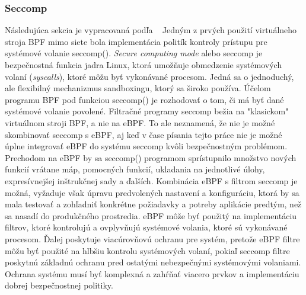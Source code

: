 \subsubsection{Seccomp}
Následujúca sekcia je vypracovaná podľa ~\cite{seccomp}
Jedným z prvých použití virtuálneho stroja BPF mimo siete bola implementácia politík kontroly prístupu pre systémové volanie seccomp(). 
\emph{Secure computing mode} alebo seccomp je bezpečnostná funkcia jadra Linux, ktorá umožňuje obmedzenie systémových volaní (\emph{syscalls}), 
ktoré môžu byť vykonávané procesom. Jedná sa o jednoduchý, ale flexibilný mechanizmus sandboxingu, ktorý sa široko používa. 
Účelom programu BPF pod funkciou seccomp() je rozhodovať o tom, či má byť dané systémové volanie povolené. Filtračné programy 
seccomp bežia na "klasickom" virtuálnom stroji BPF, a nie na eBPF. To ale neznamená, že nie je možné skombinovať seccomp s eBPF, 
aj keď v čase písania tejto práce nie je možné úplne integrovať eBPF do systému seccomp kvôli bezpečnostným problémom. 
Prechodom na eBPF by sa seccomp() programom sprístupnilo množstvo nových funkcií vrátane máp, pomocných funkcií, ukladania na jednotlivé úlohy, 
expresívnejšej inštrukčnej sady a ďalších. Kombinácia eBPF s filtrom seccomp je možná, vyžaduje však úpravu predvolených 
nastavení a konfiguráciu, ktorá by sa mala testovať a zohľadniť konkrétne požiadavky a potreby aplikácie predtým, než sa nasadí do produkčného 
prostredia. eBPF môže byť použitý na implementáciu filtrov, ktoré kontrolujú a ovplyvňujú systémové volania, ktoré sú vykonávané procesom. 
Ďalej poskytuje viacúrovňovú ochranu pre systém, pretože eBPF filtre môžu byť použité na hlbšiu kontrolu systémových volaní, 
pokiaľ seccomp filtre poskytnú základnú ochranu pred ostatými nebezpečnými systémovými volaniami. Ochrana systému musí byť komplexná a zahŕňať viacero prvkov 
a implementáciu dobrej bezpečnostnej politiky.

